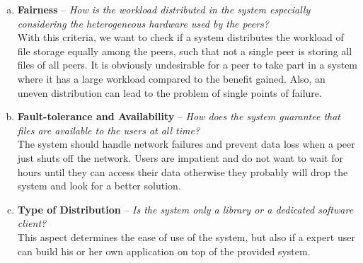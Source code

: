 \begin{enumerate}[(a)]
\item \textbf{Fairness} -- \textit{How is the workload distributed in the system especially considering the heterogeneous hardware used by the peers?}\\
With this criteria, we want to check if a system distributes the workload of file storage equally among the peers, such that not a single peer is storing all files of all peers. It is obviously undesirable for a peer to take part in a system where it has a large workload compared to the benefit gained. Also, an uneven distribution can lead to the problem of single points of failure.

\item \textbf{Fault-tolerance and Availability} -- \textit{How does the system guarantee that files are available to the users at all time?}\\
The system should handle network failures and prevent data loss when a peer just shuts off the network. Users are impatient and do not want to wait for hours until they can access their data otherwise they probably will drop the system and look for a better solution.

\item \textbf{Type of Distribution} -- \textit{Is the system only a library or a dedicated software client?}\\
This aspect determines the ease of use of the system, but also if a expert user can build his or her own application on top of the provided system.


\end{enumerate}
